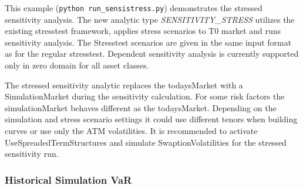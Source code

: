 This example ({\tt python run\_sensistress.py}) demonstrates the stressed sensitivity analysis. The new analytic type \emph{SENSITIVITY\_STRESS} utilizes the existing stresstest framework, applies stress scenarios to T0 market and runs sensitivity analysis.
The Stresstest scenarios are given in the same input format as for the regular stresstest. Dependent sensitivity analysis is currently supported only in zero domain for all asset classes.

The stressed sensitivity analytic replaces the todaysMarket with a SimulationMarket during the sensitivity calculation. For some risk factors the simulationMarket behaves  different as the todaysMarket.
Depending on the simulation and stress scenario settings it could use different tenors when building curves  or use only the ATM volatilities. It is recommended to activate UseSpreadedTermStructures and simulate SwaptionVolatilities for the stressed sensitivity run.

\subsubsection{Historical Simulation VaR}
\label{example:marketrisk_histsim}

